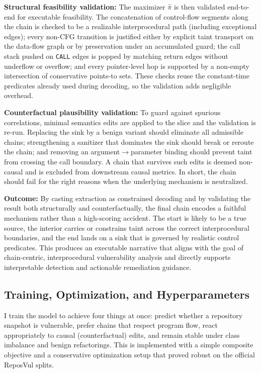 \documentclass{buthesis}
\begin{document}
\textbf{Structural feasibility validation:}
The maximizer $\hat{\pi}$ is then validated end-to-end for executable feasibility. The concatenation of control-flow segments along the chain is checked to be a realizable interprocedural path (including exceptional edges); every non-CFG transition is justified either by explicit taint transport on the data-flow graph or by preservation under an accumulated guard; the call stack pushed on \texttt{CALL} edges is popped by matching return edges without underflow or overflow; and every pointer-level hop is supported by a non-empty intersection of conservative points-to sets. These checks reuse the constant-time predicates already used during decoding, so the validation adds negligible overhead.

\textbf{Counterfactual plausibility validation:}
To guard against spurious correlations, minimal semantics edits are applied to the slice and the validation is re-run. Replacing the sink by a benign variant should eliminate all admissible chains; strengthening a sanitizer that dominates the sink should break or reroute the chain; and removing an argument$\rightarrow$parameter binding should prevent taint from crossing the call boundary. A chain that survives such edits is deemed non-causal and is excluded from downstream causal metrics. In short, the chain should fail for the right reasons when the underlying mechanism is neutralized.

\textbf{Outcome:}
By casting extraction as constrained decoding and by validating the result both structurally and counterfactually, the final chain encodes a faithful mechanism rather than a high-scoring accident. The start is likely to be a true source, the interior carries or constrains taint across the correct interprocedural boundaries, and the end lands on a sink that is governed by realistic control predicates. This produces an executable narrative that aligns with the goal of chain-centric, interprocedural vulnerability analysis and directly supports interpretable detection and actionable remediation guidance.


\subsection{Training, Optimization, and Hyperparameters}
\label{sec:method-train}

I train the model to achieve four things at once: predict whether a repository snapshot is vulnerable, prefer chains that respect program flow, react appropriately to causal (counterfactual) edits, and remain stable under class imbalance and benign refactorings. This is implemented with a simple composite objective and a conservative optimization setup that proved robust on the official ReposVul splits.
\end{document}
